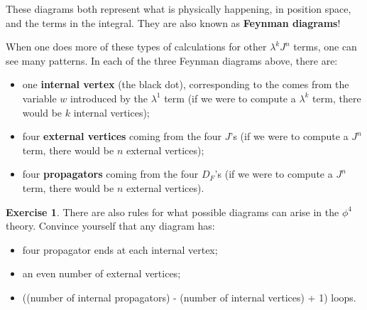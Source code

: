 \documentclass{report}
\theoremstyle{plain}
\theoremstyle{definition}
\newtheorem{exercise}{Exercise}[section]
\theoremstyle{remark}
\begin{document}
\begin{center}
\begin{minipage}{0.3\textwidth}
    \centering
  \end{minipage}
\end{center}
These diagrams both represent what is physically happening, in
position space, and the terms in the integral. They are also known as
{\bf Feynman diagrams}!

When one does more of these types of calculations for other
$\lambda^k J^n$ terms, one can see many patterns. In each of the three
Feynman diagrams above, there are:
\begin{itemize}
\item one {\bf internal vertex} (the black dot), corresponding to the
  comes from the variable $w$ introduced by the $\lambda^1$ term (if
  we were to compute a $\lambda^k$ term, there would be $k$ internal
  vertices);
\item four {\bf external vertices} coming from the four $J$'s (if we
  were to compute a $J^n$ term, there would be $n$ external vertices);
\item four {\bf propagators} coming from the four $D_F$'s (if we were
  to compute a $J^n$ term, there would be $n$ external vertices).
\end{itemize}

\begin{exercise}
  There are also rules for what possible diagrams can arise in the
  $\phi^4$ theory. Convince yourself that any diagram has:
  \begin{itemize}
  \item four propagator ends at each internal vertex;
  \item an even number of external vertices;
  \item ((number of internal propagators) - (number of internal
    vertices) + 1) loops.
  \end{itemize}
\end{exercise}
\end{document}
